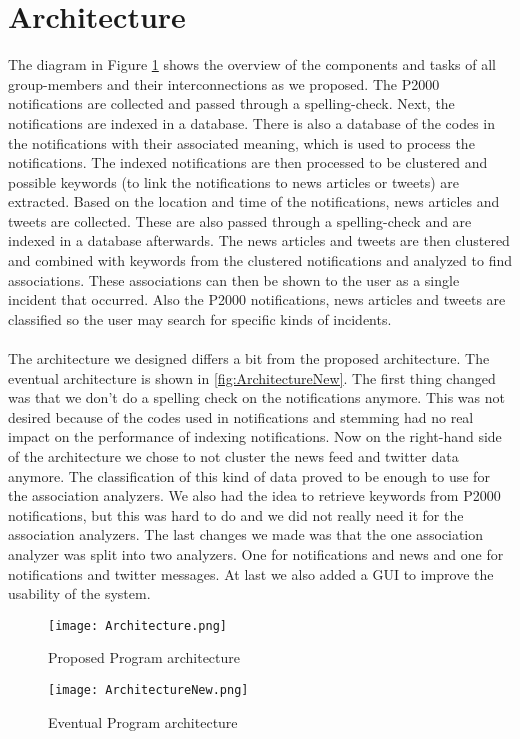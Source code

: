 \newpage
\section{Architecture}
The diagram in Figure \ref{fig:Architecture} shows the overview of the components and tasks of all group-members and their interconnections as we proposed. The P2000 notifications are collected and passed through a spelling-check. Next, the notifications are indexed in a database. There is also a database of the codes in the notifications with their associated meaning, which is used to process the notifications. The indexed notifications are then processed to be clustered and possible keywords (to link the notifications to news articles or tweets) are extracted. Based on the location and time of the notifications, news articles and tweets are collected. These are also passed through a spelling-check and are indexed in a database afterwards. The news articles and tweets are then clustered and combined with keywords from the clustered notifications and analyzed to find associations. These associations can then be shown to the user as a single incident that occurred. Also the P2000 notifications, news articles and tweets are classified so the user may search for specific kinds of incidents. \\
\\
The architecture we designed differs a bit from the proposed architecture. The eventual architecture is shown in \autoref{fig:ArchitectureNew}. The first thing changed was that we don't do a spelling check on the notifications anymore. This was not desired because of the codes used in notifications and stemming had no real impact on the performance of indexing notifications. Now on the right-hand side of the architecture we chose to not cluster the news feed and twitter data anymore. The classification of this kind of data proved to be enough to use for the association analyzers. We also had the idea to retrieve keywords from P2000 notifications, but this was hard to do and we did not really need it for the association analyzers. The last changes we made was that the one association analyzer was split into two analyzers. One for notifications and news and one for notifications and twitter messages. At last we also added a GUI to improve the usability of the system.

\begin{center}
\begin{figure}[h!]
  \texttt{[image: Architecture.png]}
  \caption{Proposed Program architecture}
  \label{fig:Architecture}
\end{figure}

\begin{figure}[h!]
  \texttt{[image: ArchitectureNew.png]}
  \caption{Eventual Program architecture}
  \label{fig:ArchitectureNew}
\end{figure}
\end{center}